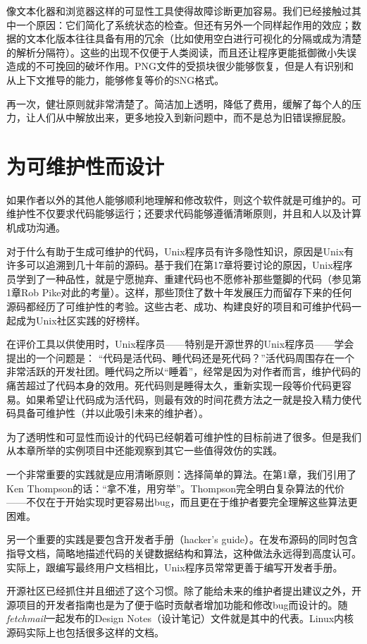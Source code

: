 \documentclass[12pt,oneside]{book}
\begin{document}
\begin{common-format}
像文本化器和浏览器这样的可显性工具使得故障诊断更加容易。我们已经接触过其中一个原因：它们简化了系统状态的检查。但还有另外一个同样起作用的效应；数据的文本化版本往往具备有用的冗余（比如使用空白进行可视化的分隔或成为清楚的解析分隔符）。这些的出现不仅便于人类阅读，而且还让程序更能抵御微小失误造成的不可挽回的破坏作用。PNG文件的受损块很少能够恢复，但是人有识别和从上下文推导的能力，能够修复等价的SNG格式。

再一次，健壮原则就非常清楚了。简洁加上透明，降低了费用，缓解了每个人的压力，让人们从中解放出来，更多地投入到新问题中，而不是总为旧错误擦屁股。

\section{为可维护性而设计}
如果作者以外的其他人能够顺利地理解和修改软件，则这个软件就是可维护的。可维护性不仅要求代码能够运行；还要求代码能够遵循清晰原则，并且和人以及计算机成功沟通。

对于什么有助于生成可维护的代码，Unix程序员有许多隐性知识，原因是Unix有许多可以追溯到几十年前的源码。基于我们在第17章将要讨论的原因，Unix程序员学到了一种品性，就是宁愿抛弃、重建代码也不愿修补那些蹩脚的代码（参见第1章Rob Pike对此的考量）。这样，那些顶住了数十年发展压力而留存下来的任何源码都经历了可维护性的考验。这些古老、成功、构建良好的项目和可维护代码一起成为Unix社区实践的好榜样。

在评价工具以供使用时，Unix程序员——特别是开源世界的Unix程序员——学会提出的一个问题是：  “代码是活代码、睡代码还是死代码？”活代码周围存在一个非常活跃的开发社团。睡代码之所以“睡着”，经常是因为对作者而言，维护代码的痛苦超过了代码本身的效用。死代码则是睡得太久，重新实现一段等价代码更容易。如果希望让代码成为活代码，则最有效的时间花费方法之一就是投入精力使代码具备可维护性（并以此吸引未来的维护者）。

为了透明性和可显性而设计的代码已经朝着可维护性的目标前进了很多。但是我们从本章所举的实例项目中还能观察到其它一些值得效仿的实践。

一个非常重要的实践就是应用清晰原则：选择简单的算法。在第1章，我们引用了Ken Thompson的话：“拿不准，用穷举”。Thompson完全明白复杂算法的代价——不仅在于开始实现时更容易出bug，而且更在于维护者要完全理解这些算法更困难。

另一个重要的实践是要包含开发者手册（hacker's guide）。在发布源码的同时包含指导文档，简略地描述代码的关键数据结构和算法，这种做法永远得到高度认可。实际上，跟编写最终用户文档相比，Unix程序员常常更善于编写开发者手册。

开源社区已经抓住并且细述了这个习惯。除了能给未来的维护者提出建议之外，开源项目的开发者指南也是为了便于临时贡献者增加功能和修改bug而设计的。随\textit{fetchmail}一起发布的Design Notes（设计笔记）文件就是其中的代表。Linux内核源码实际上也包括很多这样的文档。


\end{common-format}
\end{document}
